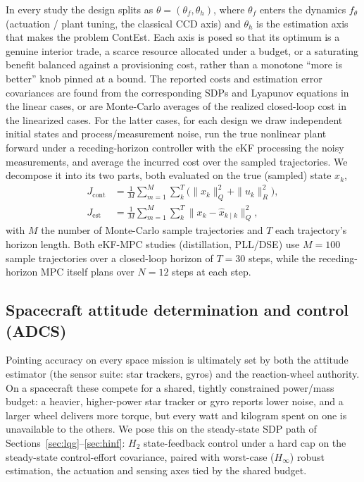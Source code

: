 \documentclass[twocolumn,amsthm]{autart}
\begin{document}
In every study the design splits as $\theta=(\theta_f,\theta_h)$, where
$\theta_f$ enters the dynamics $f_\theta$ (actuation / plant tuning, the
classical CCD axis) and $\theta_h$ is the estimation axis that makes the problem
ContEst. Each axis is posed so that its optimum is a genuine interior trade, a scarce resource allocated under a budget, or a saturating benefit balanced
against a provisioning cost, rather than a monotone ``more is better'' knob pinned
at a bound. The reported costs and estimation error covariances are found from the corresponding SDPs and Lyapunov equations in the linear cases, or are Monte-Carlo averages of the realized
closed-loop cost in the linearized cases. For the latter cases, for each design we draw independent initial states and
process/measurement noise, run the true nonlinear plant forward under a
receding-horizon controller with the eKF processing the noisy measurements, and
average the incurred cost over the sampled trajectories. We decompose it into its
two parts, both evaluated on the true (sampled) state $x_k$,
\begin{equation}\label{eq:costsplit}
\begin{aligned}
J_{\mathrm{cont}} &= \frac{1}{M}\sum_{m=1}^M\sum_{k}^T\!\big(\|x_k\|_Q^2+\|u_k\|_R^2\big),\\
J_{\mathrm{est}} &= \frac{1}{M}\sum_{m=1}^M\sum_{k}^T\|x_k-\hat x_{k\mid k}\|_Q^2,
\end{aligned}
\end{equation}
with $M$ the number of Monte-Carlo sample trajectories and $T$ each trajectory's
horizon length. Both eKF-MPC studies (distillation, PLL/DSE) use $M=100$ sample
trajectories over a closed-loop horizon of $T=30$ steps, while the receding-horizon
MPC itself plans over $N=12$ steps at each step.

\subsection{Spacecraft attitude determination and control (ADCS)}
\label{sec:sim:adcs}

Pointing accuracy on every space mission is ultimately set by both the attitude estimator (the sensor suite: star trackers, gyros)
and the reaction-wheel authority. On a spacecraft these compete for a shared,
tightly constrained power/mass budget: a heavier, higher-power star tracker
or gyro reports lower noise, and a larger wheel delivers more torque, but every
watt and kilogram spent on one is unavailable to the others. We pose this on the
steady-state SDP path of Sections~\ref{sec:lqg}--\ref{sec:hinf}: $H_2$
state-feedback control under a hard cap on the steady-state control-effort
covariance, paired with worst-case ($H_\infty$) robust estimation, the
actuation and sensing axes tied by the shared budget.
\end{document}
